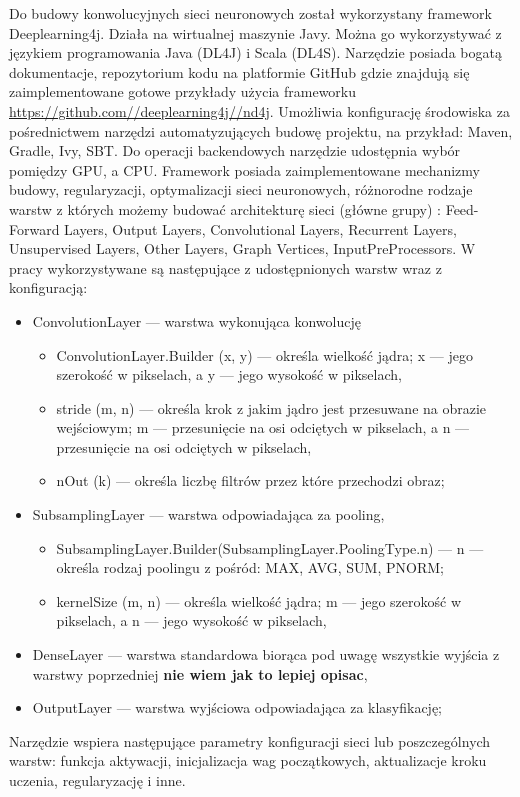\documentclass[a4paper,12pt]{article}
\begin{document}
        \par Do budowy konwolucyjnych sieci neuronowych został wykorzystany framework Deeplearning4j. Działa na wirtualnej maszynie Javy. Można go wykorzystywać z językiem programowania Java (DL4J) i Scala (DL4S). Narzędzie posiada bogatą dokumentacje, repozytorium kodu na platformie GitHub gdzie znajdują się zaimplementowane gotowe przykłady użycia frameworku \href{https://github.com//deeplearning4j//nd4j}{\url{https://github.com//deeplearning4j//nd4j}}. Umożliwia konfigurację środowiska za pośrednictwem narzędzi automatyzujących budowę projektu, na przykład: Maven, Gradle, Ivy, SBT. Do operacji backendowych narzędzie udostępnia wybór pomiędzy GPU, a CPU. Framework 
        posiada zaimplementowane mechanizmy budowy, regularyzacji, optymalizacji sieci neuronowych, różnorodne rodzaje warstw z których możemy budować architekturę sieci (główne grupy) : Feed-Forward Layers, Output Layers, Convolutional Layers, Recurrent Layers,  Unsupervised Layers, Other Layers, Graph Vertices, InputPreProcessors. W pracy wykorzystywane są następujące z udostępnionych warstw wraz z konfiguracją: 
        \begin{itemize}
            \item ConvolutionLayer --- warstwa wykonująca konwolucję
                \begin{itemize}
                \item ConvolutionLayer.Builder (x, y) --- określa wielkość jądra; x --- jego szerokość w pikselach, a y --- jego wysokość w pikselach,
                \item stride (m, n) --- określa krok z jakim jądro jest przesuwane na obrazie wejściowym; m --- przesunięcie na osi odciętych w pikselach, a n --- przesunięcie na osi odciętych w pikselach,
                \item nOut (k) --- określa liczbę filtrów przez które przechodzi obraz;
                \end{itemize}
            \item SubsamplingLayer --- warstwa odpowiadająca za pooling,
                \begin{itemize}
                \item SubsamplingLayer.Builder(SubsamplingLayer.PoolingType.n) --- n --- określa rodzaj poolingu z pośród: MAX, AVG, SUM, PNORM; 
                \item kernelSize (m, n) --- określa wielkość jądra; m --- jego szerokość w pikselach, a n --- jego wysokość w pikselach,
                \end{itemize}
            \item DenseLayer --- warstwa standardowa biorąca pod uwagę wszystkie wyjścia z warstwy poprzedniej \textbf{nie wiem jak to lepiej opisac},
            \item OutputLayer --- warstwa wyjściowa odpowiadająca za klasyfikację;
        \end{itemize}
        \par Narzędzie wspiera następujące parametry konfiguracji sieci lub poszczególnych warstw: funkcja aktywacji, inicjalizacja wag początkowych, aktualizacje kroku uczenia, regularyzację i inne.
        
\end{document}
